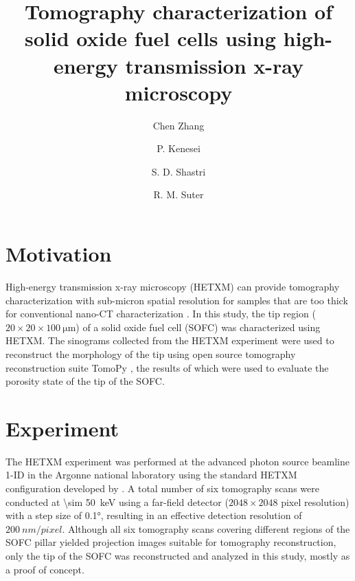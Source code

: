 \documentclass[12pt]{scrartcl}
\begin{document}
\title{
Tomography characterization of solid oxide fuel cells using high-energy transmission x-ray microscopy}
\author[a]{Chen Zhang}
\author[b]{P. Kenesei}
\author[b]{S. D. Shastri}
\author[a]{R. M. Suter}


\maketitle

\section{Motivation}\label{sec: motivation}

High-energy transmission x-ray microscopy (HETXM) can provide tomography characterization with sub-micron spatial resolution for samples that are too thick for conventional nano-CT characterization \citep{Shastri_etal2015}.
In this study, the tip region ($20\times20\times\SI{100}{\micro\meter}$) of a solid oxide fuel cell (SOFC) was characterized using HETXM.
The sinograms collected from the HETXM experiment were used to reconstruct the morphology of the tip using open source tomography reconstruction suite TomoPy \citep{Gursoy_etal2014}, the results of which were used to evaluate the porosity state of the tip of the SOFC. 


\section{Experiment}\label{sec: exp}

The HETXM experiment was performed at the advanced photon source beamline 1-ID in the Argonne national laboratory using the standard HETXM configuration developed by \citet{Shastri_etal2015}.
A total number of six tomography scans were conducted at \SI{\sim 50}{keV} using a far-field detector ($2048\times2048$ pixel resolution) with a step size of \ang{0.1}, resulting in an effective detection resolution of $\SI{200}{nm/pixel}$.
Although all six tomography scans covering different regions of the SOFC pillar yielded projection images suitable for tomography reconstruction, only the tip of the SOFC was reconstructed and analyzed in this study, mostly as a proof of concept.


\end{document}
